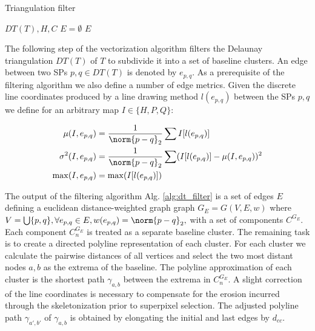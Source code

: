 \begin{algorithm}[H]
\caption{Triangulation filter}
\label{alg:dt_filter}
\begin{algorithmic}[1]
	\renewcommand{\algorithmicrequire}{\textbf{Input:}}
	\REQUIRE $DT(T), H, C$ 
	\STATE $E = \emptyset$
			\ENDIF
		\ENDIF 
	\ENDFOR
	\RETURN $E$
\end{algorithmic}
\end{algorithm}

The following step of the vectorization algorithm filters the Delaunay
triangulation $DT(T)$ of $T$ to subdivide it into a set of baseline clusters.
An edge between two SPs $p, q \in DT(T)$ is denoted by $e_{p, q}$. As a
prerequisite of the filtering algorithm we also define a number of edge
metrics. Given the discrete line coordinates produced by a line drawing method
$l(e_{p, q})$ between the SPs $p, q$ we define for an arbitrary map $I \in \{H,
P, Q\}$:

\begin{eqnarray*}
	\mu(I, e_{p, q}) &= \frac{1}{\norm{p - q}_2}\sum I[l(e_{p, q})]\\
	\sigma^2(I, e_{p, q}) &= \frac{1}{\norm{p - q}_2}\sum (I[l(e_{p, q})] - \mu(I, e_{p, q}))^2\\
	\max(I, e_{p, q}) &= \max(I[l(e_{p, q})])
\end{eqnarray*}

The output of the filtering algorithm Alg. \ref{alg:dt_filter} is a set of
edges $E$ defining a euclidean distance-weighted graph graph $G_E = G(V, E, w)$
where $V=\bigcup \{p, q\}, \forall e_{p,q} \in E, w(e_{p, q})= \norm{p - q}_2,
$ with a set of components $C^{G_E}$. Each component $C^{G_E}_n$ is treated as
a separate baseline cluster. The remaining task is to create a directed
polyline representation of each cluster. For each cluster we calculate the
pairwise distances of all vertices and select the two most distant nodes $a, b$
as the extrema of the baseline. The polyline approximation of each cluster is
the shortest path $\gamma_{a, b}$ between the extrema in $C^{G_E}_n$. A slight
correction of the line coordinates is necessary to compensate for the erosion
incurred through the skeletonization prior to superpixel selection. The
adjusted polyline path $\gamma_{a', b'}$ of $\gamma_{a, b}$ is obtained by
elongating the initial and last edges by $d_{cc}$.

